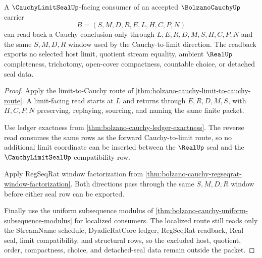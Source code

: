 \begin{theorem}
\label{thm:bolzano-cauchy-limit-readback-nonescape}
A $\CauchyLimitSealUp$-facing consumer of an accepted $\BolzanoCauchyUp$ carrier
$$
B=(S,M,D,R,E,L,H,C,P,N)
$$
can read back a Cauchy conclusion only through $L,E,R,D,M,S,H,C,P,N$ and the same $S,M,D,R$ window used by the Cauchy-to-limit direction. The readback exports no selected host limit, quotient stream equality, ambient $\RealUp$ completeness, trichotomy, open-cover compactness, countable choice, or detached seal data.
\end{theorem}
\begin{proof}
Apply the limit-to-Cauchy route of \autoref{thm:bolzano-cauchy-limit-to-cauchy-route}. A limit-facing read starts at $L$ and returns through $E,R,D,M,S$, with $H,C,P,N$ preserving, replaying, sourcing, and naming the same finite packet.

Use ledger exactness from \autoref{thm:bolzano-cauchy-ledger-exactness}. The reverse read consumes the same rows as the forward Cauchy-to-limit route, so no additional limit coordinate can be inserted between the $\RealUp$ seal and the $\CauchyLimitSealUp$ compatibility row.

Apply RegSeqRat window factorization from \autoref{thm:bolzano-cauchy-regseqrat-window-factorization}. Both directions pass through the same $S,M,D,R$ window before either seal row can be exported.

Finally use the uniform subsequence modulus of \autoref{thm:bolzano-cauchy-uniform-subsequence-modulus} for localized consumers. The localized route still reads only the StreamName schedule, DyadicRatCore ledger, RegSeqRat readback, Real seal, limit compatibility, and structural rows, so the excluded host, quotient, order, compactness, choice, and detached-seal data remain outside the packet.
\end{proof}


